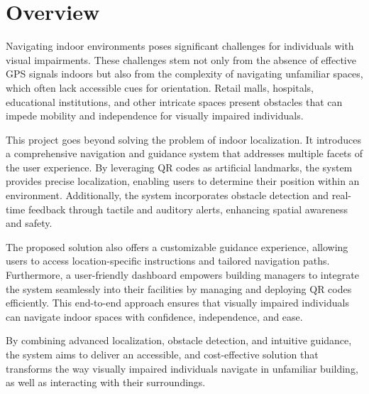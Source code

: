 \section{Overview}

Navigating indoor environments poses significant challenges for individuals with visual impairments. These challenges stem not only from the absence of effective GPS signals indoors but also from the complexity of navigating unfamiliar spaces, which often lack accessible cues for orientation. Retail malls, hospitals, educational institutions, and other intricate spaces present obstacles that can impede mobility and independence for visually impaired individuals.

This project goes beyond solving the problem of indoor localization. It introduces a comprehensive navigation and guidance system that addresses multiple facets of the user experience. By leveraging QR codes as artificial landmarks, the system provides precise localization, enabling users to determine their position within an environment. Additionally, the system incorporates obstacle detection and real-time feedback through tactile and auditory alerts, enhancing spatial awareness and safety.

The proposed solution also offers a customizable guidance experience, allowing users to access location-specific instructions and tailored navigation paths. Furthermore, a user-friendly dashboard empowers building managers to integrate the system seamlessly into their facilities by managing and deploying QR codes efficiently. This end-to-end approach ensures that visually impaired individuals can navigate indoor spaces with confidence, independence, and ease.

By combining advanced localization, obstacle detection, and intuitive guidance, the system aims to deliver an accessible, and cost-effective solution that transforms the way visually impaired individuals navigate in unfamiliar building, as well as interacting with their surroundings.
